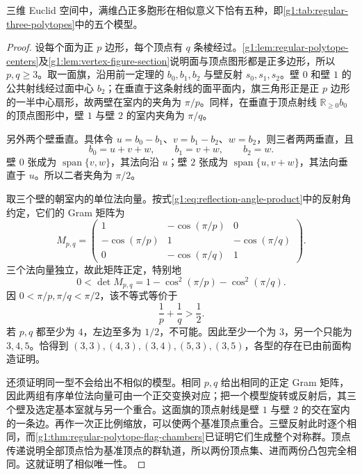 \begin{theorem}
	\label{g1:thm:regular-three-classification}
	三维 Euclid 空间中，满维凸正多胞形在相似意义下恰有五种，即\cref{g1:tab:regular-three-polytopes}中的五个模型。
\end{theorem}
\begin{proof}
	设每个面为正 \(p\) 边形，每个顶点有 \(q\) 条棱经过。\cref{g1:lem:regular-polytope-centers}及\cref{g1:lem:vertex-figure-section}说明面与顶点图形都是正多边形，所以 \(p,q\ge3\)。取一面旗，沿用前一定理的 \(b_0,b_1,b_2\) 与壁反射 \(s_0,s_1,s_2\)。壁 \(0\) 和壁 \(1\) 的公共射线经过面中心 \(b_2\)；在垂直于这条射线的面平面内，旗三角形正是正 \(p\) 边形的一半中心扇形，故两壁在室内的夹角为 \(\pi/p\)。同样，在垂直于顶点射线 \(\mathbb R_{\ge0}b_0\) 的顶点图形中，壁 \(1\) 与壁 \(2\) 的室内夹角为 \(\pi/q\)。

	另外两个壁垂直。具体令 \(u=b_0-b_1\)、\(v=b_1-b_2\)、\(w=b_2\)，则三者两两垂直，且
	\[
		b_0=u+v+w,\qquad b_1=v+w,\qquad b_2=w.
	\]
	壁 \(0\) 张成为 \(\operatorname{span}\{v,w\}\)，其法向沿 \(u\)；壁 \(2\) 张成为 \(\operatorname{span}\{u,v+w\}\)，其法向垂直于 \(u\)。所以二者夹角为 \(\pi/2\)。

	取三个壁的朝室内的单位法向量。按式\eqref{g1:eq:reflection-angle-product}中的反射角约定，它们的 Gram 矩阵为
	\[
		M_{p,q}=
		\begin{pmatrix}
			1&-\cos(\pi/p)&0\\
			-\cos(\pi/p)&1&-\cos(\pi/q)\\
			0&-\cos(\pi/q)&1
		\end{pmatrix}.
	\]
	三个法向量独立，故此矩阵正定，特别地
	\[
		0<\det M_{p,q}
		=1-\cos^2(\pi/p)-\cos^2(\pi/q).
	\]
	因 \(0<\pi/p,\pi/q<\pi/2\)，该不等式等价于
	\begin{equation}
		\label{g1:eq:regular-three-pq-bound}
		\frac1p+\frac1q>\frac12.
	\end{equation}
	若 \(p,q\) 都至少为 \(4\)，左边至多为 \(1/2\)，不可能。因此至少一个为 \(3\)，另一个只能为 \(3,4,5\)。恰得到 \((3,3),(4,3),(3,4),(5,3),(3,5)\)，各型的存在已由前面构造证明。

	还须证明同一型不会给出不相似的模型。相同 \(p,q\) 给出相同的正定 Gram 矩阵，因此两组有序单位法向量可由一个正交变换对应；把一个模型旋转或反射后，其三个壁及选定基本室就与另一个重合。这面旗的顶点射线是壁 \(1\) 与壁 \(2\) 的交在室内的一条边。再作一次正比例缩放，可以使两个基准顶点重合。三壁反射此时逐个相同，而\cref{g1:thm:regular-polytope-flag-chambers}已证明它们生成整个对称群。顶点传递说明全部顶点恰为基准顶点的群轨道，所以两份顶点集、进而两份凸包完全相同。这就证明了相似唯一性。
\end{proof}

